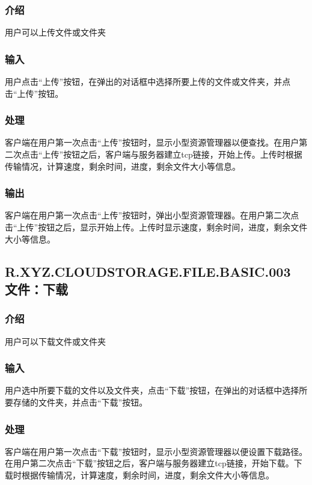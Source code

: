 \subsubsection{介绍}
用户可以上传文件或文件夹

\subsubsection{输入}
用户点击“上传”按钮，在弹出的对话框中选择所要上传的文件或文件夹，并点击“上传”按钮。

\subsubsection{处理}
客户端在用户第一次点击“上传”按钮时，显示小型资源管理器以便查找。在用户第二次点击“上传”按钮之后，客户端与服务器建立tcp链接，开始上传。上传时根据传输情况，计算速度，剩余时间，进度，剩余文件大小等信息。

\subsubsection{输出}
客户端在用户第一次点击“上传”按钮时，弹出小型资源管理器。在用户第二次点击“上传”按钮之后，显示开始上传。上传时显示速度，剩余时间，进度，剩余文件大小等信息。

\subsection{R.XYZ.CLOUDSTORAGE.FILE.BASIC.003 文件：下载}

\subsubsection{介绍}
用户可以下载文件或文件夹

\subsubsection{输入}
用户选中所要下载的文件以及文件夹，点击“下载”按钮，在弹出的对话框中选择所要存储的文件夹，并点击“下载”按钮。

\subsubsection{处理}
客户端在用户第一次点击“下载”按钮时，显示小型资源管理器以便设置下载路径。在用户第二次点击“下载”按钮之后，客户端与服务器建立tcp链接，开始下载。下载时根据传输情况，计算速度，剩余时间，进度，剩余文件大小等信息。

